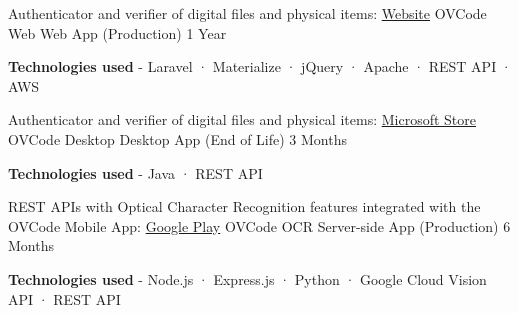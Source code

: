 \begin{cventries}
  \cventry
    {Authenticator and verifier of digital files and physical items: \href{https://ovcode.com/}{Website} } %
    {OVCode Web} %
    {Web App (Production)} %
    {1 Year} %
    {
      \begin{cvitems} %
        \item {\textbf{Technologies used} \hspace{0.03cm} - \hspace{0.03cm} Laravel \hspace{0.03cm} · \hspace{0.03cm} Materialize \hspace{0.03cm} · \hspace{0.03cm} jQuery \hspace{0.03cm} · \hspace{0.03cm} Apache \hspace{0.03cm} · \hspace{0.03cm} REST API \hspace{0.03cm} · \hspace{0.03cm} AWS \\}
      \end{cvitems}
    }
  \cventry
    {Authenticator and verifier of digital files and physical items: \href{https://www.microsoft.com/en-us/p/ovcode/9p2tlm03m56x}{Microsoft Store}} %
    {OVCode Desktop} %
    {Desktop App (End of Life)} %
    {3 Months} %
    {
      \begin{cvitems} %
        \item {\textbf{Technologies used} \hspace{0.03cm} - \hspace{0.03cm} Java \hspace{0.03cm} · \hspace{0.03cm} REST API \\}
      \end{cvitems}
    }
  \cventry
    {REST APIs with Optical Character Recognition features integrated with the OVCode Mobile App: \href{https://play.google.com/store/apps/details?id=com.nextix.ovcode}{Google Play}} %
    {OVCode OCR} %
    {Server-side App (Production)} %
    {6 Months} %
    {
      \begin{cvitems} %
        \item {\textbf{Technologies used} \hspace{0.03cm} - \hspace{0.03cm} Node.js \hspace{0.03cm} · \hspace{0.03cm} Express.js \hspace{0.03cm} · \hspace{0.03cm} Python \hspace{0.03cm} · \hspace{0.03cm} Google Cloud Vision API \hspace{0.03cm} · \hspace{0.03cm} REST API \\}

\end{cvitems}}
\end{cventries}
